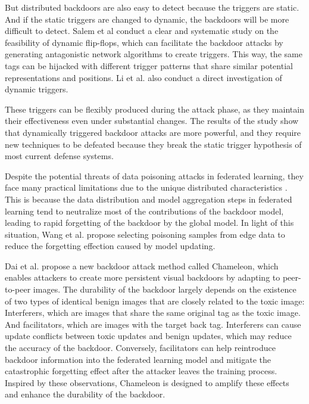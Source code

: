 \documentclass[conference]{IEEEtran}
\begin{document}
But distributed backdoors are also easy to detect because the triggers are static.
And if the static triggers are changed to dynamic, 
the backdoors will be more difficult to detect.
Salem et al \cite{b60} conduct a
clear and systematic study on the feasibility of dynamic flip-flops,
which can facilitate the backdoor attacks by generating antagonistic
network algorithms to create triggers. This way, the same tags can be
hijacked with different trigger patterns that share similar potential
representations and positions. Li et al. \cite{b61} also conduct a direct
investigation of dynamic triggers.

These triggers can be flexibly produced
during the attack phase, as they maintain their effectiveness even
under substantial changes. The results of the study show that dynamically
triggered backdoor attacks are more powerful, and they require new techniques
to be defeated because they break the static trigger hypothesis of most current
defense systems.

Despite the potential threats of data poisoning attacks in federated learning,
they face many practical limitations due to the unique distributed characteristics \cite{b251}.
This is because the data distribution and model aggregation steps in federated learning tend to neutralize
most of the contributions of the backdoor model, leading to rapid forgetting of the backdoor by the global model.
In light of this situation, Wang et al.\cite{b251} propose selecting poisoning samples from edge data to reduce the
forgetting effection caused by model updating.

Dai et al.\cite{b64} propose a new backdoor attack method called Chameleon,
which enables attackers to create more persistent visual backdoors by adapting
to peer-to-peer images. The durability of the backdoor largely depends
on the existence of two types of identical benign images that are closely
related to the toxic image: Interferers, which are images that share
the same original tag as the toxic image. And facilitators, which are
images with the target back tag. Interferers can cause update conflicts
between toxic updates and benign updates, which may reduce the accuracy of
the backdoor. Conversely, facilitators can help reintroduce backdoor
information into the federated learning model and mitigate the catastrophic
forgetting effect after the attacker leaves the training process. Inspired by
these observations, Chameleon is designed to amplify these effects and enhance
the durability of the backdoor.
\end{document}

